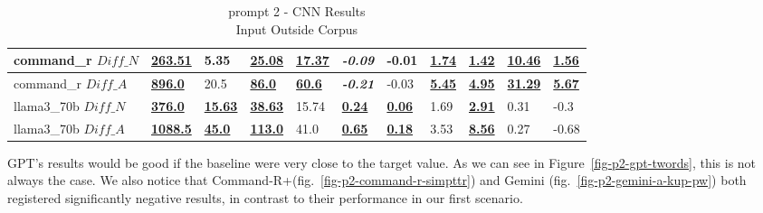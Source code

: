 \documentclass[11pt]{article}
\begin{document}
\begin{table}[hpb]
{\begin{tabular}{lllllllllll}
            command\_r $Diff\_N$  & \textbf{\underline{263.51}}  & 5.35                       & \textbf{\underline{25.08}}  & \textbf{\underline{17.37}} & \textbf{\textit{-0.09}}   & -0.01                     & \textbf{\underline{1.74}} & \textbf{\underline{1.42}} & \textbf{\underline{10.46}} & \textbf{\underline{1.56}} \\ \midrule
            command\_r $Diff\_A$  & \textbf{\underline{896.0}}   & 20.5                       & \textbf{\underline{86.0}}   & \textbf{\underline{60.6}}  & \textbf{\textit{-0.21}}   & -0.03                     & \textbf{\underline{5.45}} & \textbf{\underline{4.95}} & \textbf{\underline{31.29}} & \textbf{\underline{5.67}} \\ \midrule
            llama3\_70b $Diff\_N$ & \textbf{\underline{376.0}}   & \textbf{\underline{15.63}} & \textbf{\underline{38.63}}  & 15.74                      & \textbf{\underline{0.24}} & \textbf{\underline{0.06}} & 1.69                      & \textbf{\underline{2.91}} & 0.31                       & -0.3                      \\ \midrule
            llama3\_70b $Diff\_A$ & \textbf{\underline{1088.5}}  & \textbf{\underline{45.0}}  & \textbf{\underline{113.0}}  & 41.0                       & \textbf{\underline{0.65}} & \textbf{\underline{0.18}} & 3.53                      & \textbf{\underline{8.56}} & 0.27                       & -0.68                     \\ \bottomrule
        \end{tabular}%
    }
    \caption{prompt 2 - CNN Results\\Input Outside Corpus}
    \label{table-prompt-2-cnn-dailymail}
\end{table}

GPT's results would be good if the baseline were very close to the target value.
As we can see in Figure~\ref{fig-p2-gpt-twords}, this is not always the case.
We also notice that Command-R+(fig.~\ref{fig-p2-command-r-simpttr}) and Gemini
(fig.~\ref{fig-p2-gemini-a-kup-pw}) both registered significantly negative
results, in contrast to their performance in our first scenario.
\end{document}
